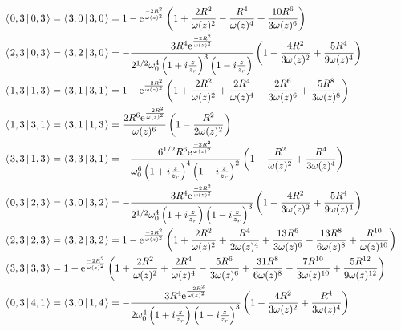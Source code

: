 \documentclass[11pt]{amsart}
\makeatletter
\newcommand{\e}{{\rm e}}				%
\newcommand{\msp}[1]{\mspace{#1mu}}		%
\newcommand{\0}{\varnothing}		%
\newcommand{\brac}[2]{\left\langle\msp{2} #1\left\lvert \msp{3.5} #2 \right.\right\rangle}	%
\newcommand{\1}{!}
\newcommand{\2}{@}
\newcommand{\3}{\#}
\newcommand{\4}{\$}
\newcommand{\5}{\%}
\newcommand{\6}{$^\wedge$}
\newcommand{\7}{\&}
\newcommand{\8}{*}
\newcommand{\9}{(}
\makeatother
\begin{document}
\begin{align*}
\\
&
\brac{0,3}{0,3}=\brac{3,0}{3,0}=1-\e^{\frac{-2R^2}{\omega(z)^2}}\left(1+\frac{2R^2}{\omega(z)^2}-\frac{R^4}{\omega(z)^4}+\frac{10R^6}{3\omega(z)^6}\right)
\\
&
\brac{2,3}{0,3} = \brac{3,2}{3,0}=-\frac{3R^4\e^{\frac{-2R^2}{\omega(z)^2}}}{2^{1/2}\omega_0^4\left(1+i\frac{z}{z_r}\right)^3\left(1-i\frac{z}{z_r}\right)}\left(1-\frac{4R^2}{3\omega(z)^2}+\frac{5R^4}{9\omega(z)^4}\right)
\\
&
\brac{1,3}{1,3} =\brac{3,1}{3,1} =1-\e^{\frac{-2R^2}{\omega(z)^2}}\left(1+\frac{2R^2}{\omega(z)^2}+\frac{2R^4}{\omega(z)^4}-\frac{2R^6}{3\omega(z)^6}+\frac{5R^8}{3\omega(z)^8}\right)
\\
&
\brac{1,3}{3,1} = \brac{3,1}{1,3} = \frac{2R^6\e^{\frac{-2R^2}{\omega(z)^2}}}{\omega(z)^6}\left(1-\frac{R^2}{2\omega(z)^2}\right)
\\
&
\brac{3,3}{1,3} = \brac{3,3}{3,1}=-\frac{6^{1/2}R^6\e                                                                                                                                                                                                                                                                                                                                                                                                                                                                                                                                                                                                                                                                                                                                                                                                                                                                                                                                                                                                                                                                                                                                      ^{\frac{-2R^2}{\omega(z)^2}}}{\omega_0^6\left(1+i\frac{z}{z_r}\right)^4\left(1-i\frac{z}{z_r}\right)^2}\left(1-\frac{R^2}{\omega(z)^2}+\frac{R^4}{3\omega(z)^4}\right)
\\
&
\brac{0,3}{2,3}=\brac{3,0}{3,2}=-\frac{3R^4\e^{\frac{-2R^2}{\omega(z)^2}}}{2^{1/2}\omega_0^4\left(1+i\frac{z}{z_r}\right)\left(1-i\frac{z}{z_r}\right)^3}\left(1-\frac{4R^2}{3\omega(z)^2}+\frac{5R^4}{9\omega(z)^4}\right)
\\
&
\brac{2,3}{2,3}=\brac{3,2}{3,2} = 1-\e^{\frac{-2R^2}{\omega(z)^2}}\left(1+\frac{2R^2}{\omega(z)^2}+\frac{R^4}{2\omega(z)^4}+\frac{13R^6}{3\omega(z)^6}-\frac{13R^8}{6\omega(z)^8}+\frac{R^{10}}{\omega(z)^{10}}\right)
\\
&
\brac{3,3}{3,3} = 1-\e^{\frac{-2R^2}{\omega(z)^2}}\left(1+\frac{2R^2}{\omega(z)^2}+\frac{2R^4}{\omega(z)^4}-\frac{5R^6}{3\omega(z)^6}+\frac{31R^8}{6\omega(z)^8}-\frac{7R^{10}}{3\omega(z)^{10}}+\frac{5R^{12}}{9\omega(z)^{12}}\right)
\\
&
\brac{0,3}{4,1} = \brac{3,0}{1,4} = -\frac{3R^4\e^{\frac{-2R^2}{\omega(z)^2}}}{2\omega_0^4\left(1+i\frac{z}{z_r}\right)\left(1-i\frac{z}{z_r}\right)^3}\left(1-\frac{4R^2}{3\omega(z)^2}+\frac{R^4}{3\omega(z)^4}\right)
\end{align*}
\end{document}

